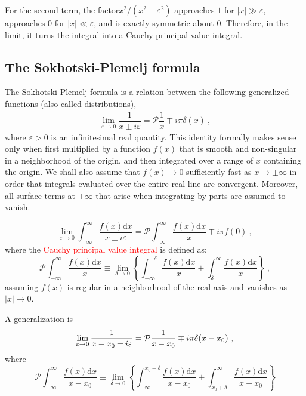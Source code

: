 \documentclass[11pt,a4paper]{article}
\newcommand{\dif}{\mathrm{d}}
\begin{document}
For the second term, the factor ​$x^2/(x^2 + \varepsilon^2)$ approaches $1$ for $|x| \gg \varepsilon$, approaches $0$ for $|x| \ll \varepsilon$, and is exactly symmetric about $0$. Therefore, in the limit, it turns the integral into a Cauchy principal value integral.

\subsection{The Sokhotski-Plemelj formula}
The Sokhotski-Plemelj formula is a relation between the following generalized functions (also called distributions),
\begin{align}
\lim_{\varepsilon \rightarrow 0} \dfrac{1}{x \pm i\varepsilon} = {\mathcal P} \dfrac{1}{x} \mp i \pi \delta(x) ~,
\end{align}
where $\varepsilon > 0$ is an infinitesimal real quantity. This identity formally makes sense only when first multiplied by a function $f(x)$ that is smooth and non-singular in a neighborhood of the origin, and then integrated over a range of $x$ containing the origin. We shall also assume that $f(x) \rightarrow 0$ sufficiently fast as $x  \rightarrow \pm \infty$ in order that integrals evaluated over the entire real line are convergent. Moreover, all surface terms at $\pm \infty$ that arise when integrating by parts are assumed to vanish.

\begin{equation}
\lim_{\varepsilon \rightarrow 0} \int_{-\infty}^\infty \dfrac{f(x) \dif x}{x\pm i\varepsilon} = {\mathcal P} \int_{-\infty}^\infty \dfrac{f(x) \dif x}{x} \mp i \pi f(0) ~,
\end{equation}
where the \textcolor{red}{Cauchy principal value integral} is defined as:
\begin{equation}
{\mathcal P} \int_{-\infty}^\infty \dfrac{f(x) \dif x}{x} \equiv \lim_{\delta \rightarrow 0} \left\{\int_{-\infty}^{-\delta} \dfrac{f(x) \dif x}{x} + \int_{\delta}^{\infty} \dfrac{f(x) \dif x}{x}  \right\} ~,
\end{equation}
assuming $f(x)$ is regular in a neighborhood of the real axis and vanishes as $|x| \rightarrow 0$. 

A generalization is
\begin{equation}
\lim_{\varepsilon \rightarrow 0} \dfrac{1}{x -x_0\pm i\varepsilon} = {\cal P} \dfrac{1}{x-x_0} \mp i \pi \delta(x-x_0)  ~,
\end{equation}
where
\begin{equation}
{\mathcal P} \int_{-\infty}^\infty \dfrac{f(x) \dif x}{x-x_0} \equiv \lim_{\delta \rightarrow 0} \left\{\int_{-\infty}^{x_0 -\delta} \dfrac{f(x) \dif x}{x-x_0}  + \int_{x_0 +\delta}^\infty \dfrac{f(x) \dif x}{x-x_0}  \right\}
\end{equation}
\end{document}
